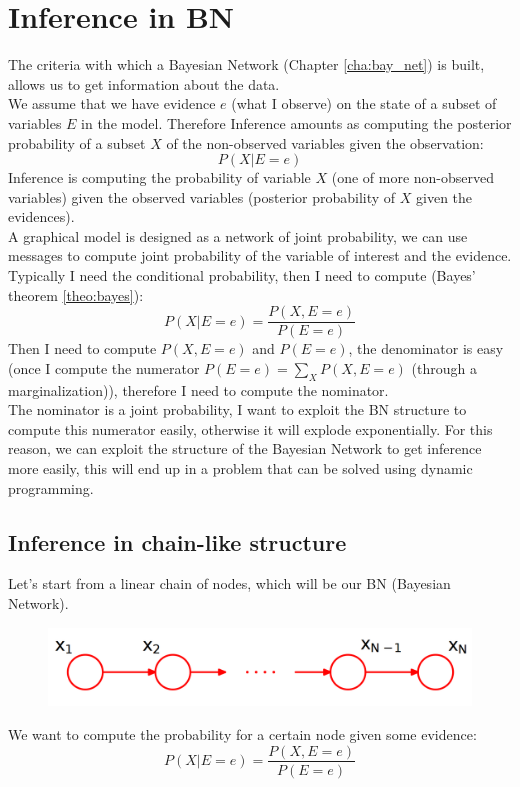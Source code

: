 \chapter{Inference in BN}
\label{cha:inter_BN}

The criteria with which a Bayesian Network (Chapter \ref{cha:bay_net}) is built,
allows us to get information about the data.\\

We assume that we have evidence $e$ (what I observe) on the state of a subset of
variables $E$ in the model. Therefore Inference amounts as computing the posterior
probability of a subset $X$ of the non-observed variables given the observation:
\[
	P(X|E = e)
\]
Inference is computing the probability of variable $X$ (one of more non-observed
variables) given the observed variables (posterior probability of $X$ given the evidences).\\

A graphical model is designed as a network of joint probability, we can use
messages to compute joint probability of the variable of interest and the
evidence. Typically I need the conditional probability, then I need to compute (Bayes'
theorem \ref{theo:bayes}):
\[
	P(X | E = e) = \frac{P(X, E=e)}{P(E=e)}
\]
Then I need to compute $P(X, E=e)$ and $P(E=e)$, the denominator is easy (once I
compute the numerator $P(E=e) = \sum_{X}P(X, E=e)$ (through a marginalization)),
therefore I need to compute the nominator.\\ The nominator is a joint
probability, I want to exploit the BN structure to compute this numerator easily,
otherwise it will explode exponentially. For this reason, we can exploit the
structure of the Bayesian Network to get inference more easily, this will end up
in a problem that can be solved using dynamic programming.

\section{Inference in chain-like structure}
Let's start from a linear chain of nodes, which will be our BN (Bayesian Network).
\begin{figure}[H]
	\centering
	\includegraphics[scale=0.3]{
		images/09_BayesianNetworksInference_chainInference.png
	}
\end{figure}
We want to compute the probability for a certain node given some evidence:
\[
	P(X| E=e) = \frac{P(X, E=e)}{P(E=e)}
\]

